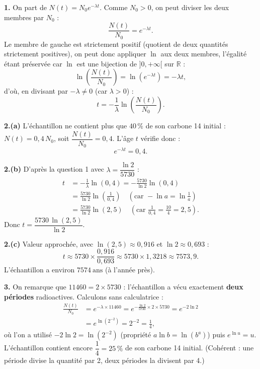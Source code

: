 \documentclass[11pt]{article}
\begin{document}
\begin{corrige}

\textbf{1.} On part de $N(t) = N_0 e^{-\lambda t}$. Comme $N_0 > 0$, on peut diviser les deux membres par $N_0$ :
\[ \frac{N(t)}{N_0} = e^{-\lambda t}. \]
Le membre de gauche est strictement positif (quotient de deux quantités strictement positives), on peut donc appliquer $\ln$ aux deux membres, l'égalité étant préservée car $\ln$ est une bijection de $]0,+\infty[$ sur $\mathbb{R}$ :
\[ \ln\!\left(\frac{N(t)}{N_0}\right) = \ln\!\left(e^{-\lambda t}\right) = -\lambda t, \]
d'où, en divisant par $-\lambda \neq 0$ (car $\lambda > 0$) :
\[ \boxed{t = -\frac{1}{\lambda}\ln\!\left(\frac{N(t)}{N_0}\right)}. \]

\textbf{2.(a)} L'échantillon ne contient plus que $40\,\%$ de son carbone 14 initial : $N(t) = 0{,}4\,N_0$, soit $\dfrac{N(t)}{N_0} = 0{,}4$. L'âge $t$ vérifie donc :
\[ e^{-\lambda t} = 0{,}4. \]

\textbf{2.(b)} D'après la question 1 avec $\lambda = \dfrac{\ln 2}{5730}$ :
\begin{align*}
t &= -\frac{1}{\lambda}\ln(0{,}4) = -\frac{5730}{\ln 2}\ln(0{,}4) \\
  &= \frac{5730}{\ln 2}\ln\!\left(\frac{1}{0{,}4}\right) \quad \left(\text{car } -\ln a = \ln\frac{1}{a}\right) \\
  &= \frac{5730}{\ln 2}\ln(2{,}5) \quad \left(\text{car } \frac{1}{0{,}4} = \frac{10}{4} = 2{,}5\right).
\end{align*}
Donc $\boxed{t = \dfrac{5730\,\ln(2{,}5)}{\ln 2}}$.

\textbf{2.(c)} Valeur approchée, avec $\ln(2{,}5)\approx 0{,}916$ et $\ln 2 \approx 0{,}693$ :
\[ t \approx 5730 \times \frac{0{,}916}{0{,}693} \approx 5730 \times 1{,}3218 \approx 7573{,}9. \]
L'échantillon a environ $\boxed{7574\ \text{ans}}$ (à l'année près).

\textbf{3.} On remarque que $11460 = 2 \times 5730$ : l'échantillon a vécu exactement \textbf{deux périodes} radioactives. Calculons sans calculatrice :
\begin{align*}
\frac{N(t)}{N_0} &= e^{-\lambda \times 11460} = e^{-\frac{\ln 2}{5730}\times 2\times 5730} = e^{-2\ln 2} \\
&= e^{\ln(2^{-2})} = 2^{-2} = \frac{1}{4},
\end{align*}
où l'on a utilisé $-2\ln 2 = \ln(2^{-2})$ (propriété $a\ln b = \ln(b^a)$) puis $e^{\ln u} = u$. L'échantillon contient encore $\boxed{\dfrac{1}{4} = 25\,\%}$ de son carbone 14 initial. (Cohérent : une période divise la quantité par 2, deux périodes la divisent par 4.)


\end{corrige}
\end{document}
